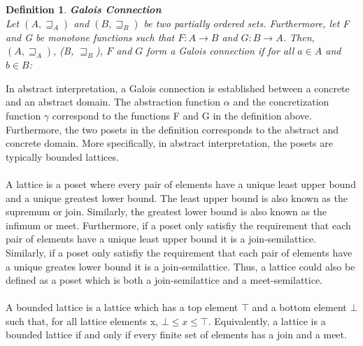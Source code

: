 \documentclass{kththesis}
\newtheorem*{definition}{Definition}
\begin{document}
\begin{definition} \textbf{Galois Connection}\\
Let $(A, \sqsupseteq_A)$ and $(B, \sqsupseteq_B)$ be two partially ordered sets. Furthermore, let F and G be monotone functions such that  $F : A \rightarrow B$ and $G : B \rightarrow A$. Then, ${(A, \sqsupseteq_A)}$, (B, $\sqsupseteq_B$), $F$ and $G$ form a Galois connection  if for all $a \in A$ and $b \in B$:
\end{definition}
\noindent
In abstract interpretation, a Galois connection is established between a concrete and an abstract domain. The abstraction function $\alpha$ and the concretization function $\gamma$ correspond to the functions F and G in the definition above. Furthermore, the two posets in the definition corresponds to the abstract and concrete domain. More specifically, in abstract interpretation, the posets are typically bounded lattices.
\\ \\%
A lattice is a poset where every pair of elements have a unique least upper bound and a unique greatest lower bound. The least upper bound is also known as the supremum or join. Similarly, the greatest lower bound is also known as the infimum or meet. Furthermore, if a poset only satisfiy the requirement that each pair of elements have a unique least upper bound it is a join-semilattice. Similarly, if a poset only satisfiy the requirement that each pair of elements have a unique greates lower bound it is a join-semilattice. Thus, a lattice could also be defined as a poset which is both a join-semilattice and a meet-semilattice.
\\ \\
A bounded lattice is a lattice which has a top element $\top$ and a bottom element $\bot$ such that, for all lattice elements x, $\bot \leq x \leq \top$. Equivalently, a lattice is a bounded lattice if and only if every finite set of elements has a join and a meet. 




\end{document}
